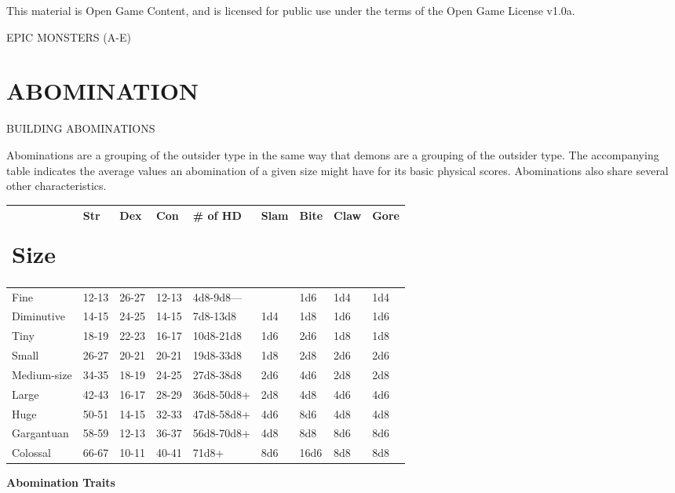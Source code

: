 \documentclass{article}
\begin{document}
This material is Open Game Content, and is licensed for public use under the terms 
of the Open Game License v1.0a.

{\LARGE{}EPIC MONSTERS (A-E)}

\vspace{12pt}
\section*{{\LARGE{}ABOMINATION }}

\vspace{12pt}
BUILDING ABOMINATIONS 

Abominations are a grouping of the outsider type in the same way that demons are 
a grouping of the outsider type. The accompanying table indicates the average values 
an abomination of a given size might have for its basic physical scores. Abominations 
also share several other characteristics.

\vspace{12pt}
\begin{tabular}{|>{\raggedright}p{49pt}|>{\raggedright}p{22pt}|>{\raggedright}p{22pt}|>{\raggedright}p{22pt}|>{\raggedright}p{47pt}|>{\raggedright}p{19pt}|>{\raggedright}p{18pt}|>{\raggedright}p{20pt}|>{\raggedright}p{19pt}|}
\hline
\section*{S\textbf{ize}} & S\textbf{tr} & D\textbf{ex} & C\textbf{on} & \#\textbf{ 
of HD} & S\textbf{lam} & B\textbf{ite} & C\textbf{law} & G\textbf{ore}\tabularnewline
\hline
Fine & 12-13 & 26-27 & 12-13 & 4d8-9d8--- &  & 1d6 & 1d4 & 1d4\tabularnewline
\hline
Diminutive & 14-15 & 24-25 & 14-15 & 7d8-13d8 & 1d4 & 1d8 & 1d6 & 1d6\tabularnewline
\hline
Tiny & 18-19 & 22-23 & 16-17 & 10d8-21d8 & 1d6 & 2d6 & 1d8 & 1d8\tabularnewline
\hline
Small & 26-27 & 20-21 & 20-21 & 19d8-33d8 & 1d8 & 2d8 & 2d6 & 2d6\tabularnewline
\hline
Medium-size & 34-35 & 18-19 & 24-25 & 27d8-38d8 & 2d6 & 4d6 & 2d8 & 2d8\tabularnewline
\hline
Large & 42-43 & 16-17 & 28-29 & 36d8-50d8+ & 2d8 & 4d8 & 4d6 & 4d6\tabularnewline
\hline
Huge & 50-51 & 14-15 & 32-33 & 47d8-58d8+ & 4d6 & 8d6 & 4d8 & 4d8\tabularnewline
\hline
Gargantuan & 58-59 & 12-13 & 36-37 & 56d8-70d8+ & 4d8 & 8d8 & 8d6 & 8d6\tabularnewline
\hline
Colossal & 66-67 & 10-11 & 40-41 & 71d8+ & 8d6 & 16d6 & 8d8 & 8d8\tabularnewline
\hline
\end{tabular}

\vspace{12pt}
\textbf{Abomination Traits}
\end{document}
